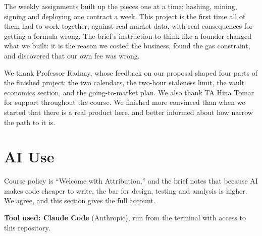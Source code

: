 \documentclass[11pt,a4paper]{article}
\begin{document}
The weekly assignments built up the pieces one at a time: hashing, mining, signing and deploying one
contract a week. This project is the first time all of them had to work together, against real
market data, with real consequences for getting a formula wrong. The brief's instruction to think
like a founder changed what we built: it is the reason we costed the business, found the gas
constraint, and discovered that our own fee was wrong.

We thank Professor Radnay, whose feedback on our proposal shaped four parts of the finished project:
the two calendars, the two-hour staleness limit, the vault economics section, and the going-to-market
plan. We also thank TA Hina Tomar for support throughout the course. We finished more convinced than
when we started that there is a real product here, and better informed about how narrow the path to
it is.

\section{AI Use}\label{sec:ai}

Course policy is ``Welcome with Attribution,'' and the brief notes that because AI makes code
cheaper to write, the bar for design, testing and analysis is higher. We agree, and this section gives
the full account.

\textbf{Tool used: Claude Code} (Anthropic), run from the terminal with access to this repository.
\end{document}
